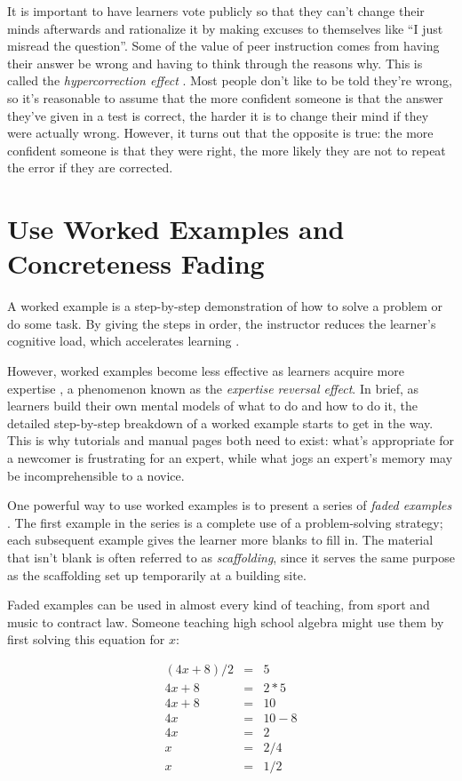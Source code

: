 \documentclass[10pt,letterpaper]{article}
\newcommand{\rulemajor}[1]{\section{#1}}
\begin{document}
It is important to have learners vote publicly so that they can't change their
minds afterwards and rationalize it by making excuses to themselves like ``I just
misread the question''.  Some of the value of peer instruction comes from having
their answer be wrong and having to think through the reasons why.  This is
called the \emph{hypercorrection effect} \cite{Metc2016}. Most people don't like
to be told they're wrong, so it's reasonable to assume that the more confident
someone is that the answer they've given in a test is correct, the harder it is
to change their mind if they were actually wrong.  However, it turns out that
the opposite is true: the more confident someone is that they were right, the
more likely they are not to repeat the error if they are corrected.

\rulemajor{Use Worked Examples and Concreteness Fading}

A worked example is a step-by-step demonstration of how to solve a problem or do
some task.  By giving the steps in order, the instructor reduces the learner's
cognitive load, which accelerates learning \cite{Atki2000,Paas2003}.

However, worked examples become less effective as learners acquire more
expertise \cite{Kaly2003,Kaly2007}, a phenomenon known as the \emph{expertise
  reversal effect}.  In brief, as learners build their own mental models of what
to do and how to do it, the detailed step-by-step breakdown of a worked example
starts to get in the way.  This is why tutorials and manual pages both need to
exist: what's appropriate for a newcomer is frustrating for an expert, while
what jogs an expert's memory may be incomprehensible to a novice.

One powerful way to use worked examples is to present a series of \emph{faded
  examples} \cite{Schw2009}.  The first example in the series is a complete use
of a problem-solving strategy; each subsequent example gives the learner more
blanks to fill in. The material that isn't blank is often referred to as
\emph{scaffolding}, since it serves the same purpose as the scaffolding set up
temporarily at a building site.

Faded examples can be used in almost every kind of teaching, from sport and
music to contract law. Someone teaching high school algebra might use them
by first solving this equation for $x$:

\begin{eqnarray*}
(4x + 8) / 2 & = & 5 \\
4x + 8 & = & 2 * 5 \\
4x + 8 & = & 10 \\
4x & = & 10 - 8 \\
4x & = & 2 \\
x & = & 2/4 \\
x & = & 1/2
\end{eqnarray*}
\end{document}
